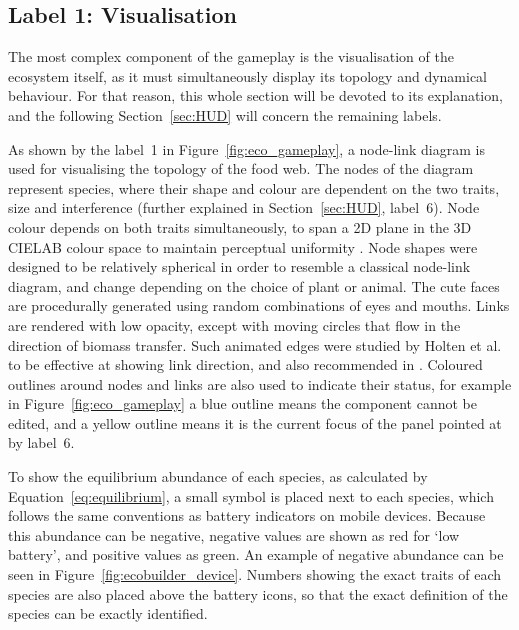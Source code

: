 \subsection{Label 1: Visualisation}
\label{sec:eco_visualisation}
The most complex component of the gameplay is the visualisation of the ecosystem itself, as it must simultaneously display its topology and dynamical behaviour. For that reason, this whole section will be devoted to its explanation, and the following Section~\ref{sec:HUD} will concern the remaining labels.

As shown by the label~1 in Figure~\ref{fig:eco_gameplay}, a node-link diagram is used for visualising the topology of the food web.
The nodes of the diagram represent species, where their shape and colour are dependent on the two traits, size and interference (further explained in Section~\ref{sec:HUD}, label~6).
Node colour depends on both traits simultaneously, to span a 2D plane in the 3D CIELAB colour space to maintain perceptual uniformity \cite{Smart2019}.
Node shapes were designed to be relatively spherical in order to resemble a classical node-link diagram, and change depending on the choice of plant or animal. The cute faces are procedurally generated using random combinations of eyes and mouths.
Links are rendered with low opacity, except with moving circles that flow in the direction of biomass transfer. Such animated edges were studied by Holten et al.\ \cite{Holten2011} to be effective at showing link direction, and also recommended in \cite{Bach2017}.
Coloured outlines around nodes and links are also used to indicate their status, for example in Figure~\ref{fig:eco_gameplay} a blue outline means the component cannot be edited, and a yellow outline means it is the current focus of the panel pointed at by label~6.

To show the equilibrium abundance of each species, as calculated by Equation~\ref{eq:equilibrium}, a small symbol is placed next to each species, which follows the same conventions as battery indicators on mobile devices. Because this abundance can be negative, negative values are shown as red for `low battery', and positive values as green. An example of negative abundance can be seen in Figure~\ref{fig:ecobuilder_device}.
Numbers showing the exact traits of each species are also placed above the battery icons, so that the exact definition of the species can be exactly identified.

